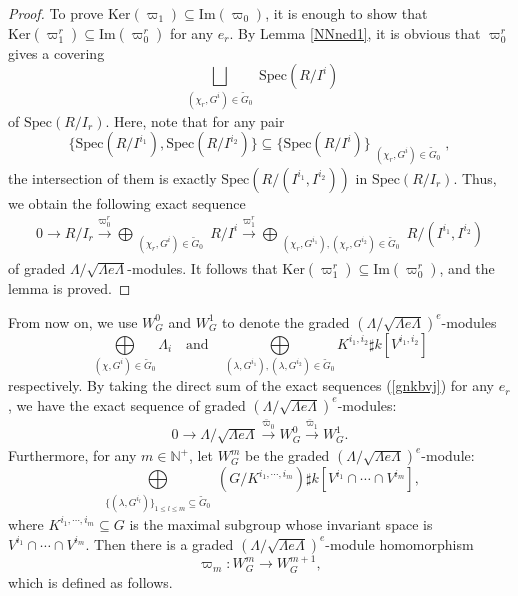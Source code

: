 \documentclass[11pt,reqno]{amsart}
\theoremstyle{definition}
\begin{document}
\begin{proof}
To prove 
$\mathrm{Ker}(\varpi_1)\subseteq
\mathrm{Im}(\varpi_0)$,
it is enough to show that 
$\mathrm{Ker}(\varpi^r_1) \subseteq \mathrm{Im}(\varpi^r_0)$ 
for any $e_r$.
By Lemma \ref{NNned1}, it is obvious that
$\varpi_0^r$ gives a covering
$$\bigsqcup\limits_{\substack{(\chi_r, G^i) \in \tilde{G}_0 
}} \mathrm{Spec}(R/I^i)$$ of $\mathrm{Spec}(R/I_r)$. 
Here, note that for any pair
$$\{ \mathrm{Spec}(R/I^{i_1}), 
\mathrm{Spec}(R/I^{i_2})\} \subseteq \Big\{ \mathrm{Spec}(R/I^i)  
\Big\}_{\substack{(\chi_r, G^i) \in \tilde{G}_0 
}},$$
the intersection of them is exactly 
$\mathrm{Spec}(R/(I^{i_1}, I^{i_2}))$ in $\mathrm{Spec}(R/I_r)$. 
Thus, we obtain the following exact sequence
\begin{align}\label{gnkbvj}
0 \longrightarrow  R/I_r \xrightarrow{\varpi^r_0}  \bigoplus_{\substack{(\chi_r, G^i) 
\in \tilde{G}_0 
}} R/ I^{i} \xrightarrow{\varpi^r_1} 
\bigoplus\limits_{\substack{(\chi_r, G^{i_1}), (\chi_r, G^{i_2}) \in \tilde{G}_0  
}} R/(I^{i_1}, I^{i_2})
\end{align}
of graded 
$\Lambda / \sqrt{\Lambda e \Lambda}$-modules. 
It follows that $\mathrm{Ker}(\varpi^r_1) 
\subseteq \mathrm{Im}(\varpi^r_0)$,
and the lemma is proved.
\end{proof}


From now on, we use $W_G^0$ and $W_G^1$ to denote 
the graded $(\Lambda /\sqrt{\Lambda e \Lambda})^e$-modules 
\begin{equation}
\label{defofWG0}
\bigoplus\limits_{(\chi, G^i) \in \tilde{G}_0} \Lambda_i\quad\mbox{and}\quad
\bigoplus\limits_{(\lambda, G^{i_1}), (\lambda, G^{i_2}) \in \tilde{G}_0}  
K^{i_1, i_2} \sharp k[V^{i_1, i_2}]
\end{equation}
respectively. 
By taking the direct sum of
the
exact sequences (\ref{gnkbvj}) for any $e_r$, we have the 
exact sequence
of graded $(\Lambda /\sqrt{\Lambda e \Lambda})^e$-modules: 
\begin{align}\label{ibyvkl}
0 \longrightarrow \Lambda/ \sqrt{ \Lambda e 
\Lambda }\xrightarrow{\bar{\varpi}_{0}} 
W_G^0 \xrightarrow{\bar{\varpi}_{1}} W_G^1.
\end{align}
Furthermore, for any $m \in \mathbb{N^+}$, 
let $W_G^m$
be the
graded $(\Lambda /\sqrt{\Lambda e \Lambda})^e$-module:
\begin{equation}\label{WGM}
 \bigoplus\limits_{\substack{\{(\lambda, G^{i_l})\}_{1 \leq l \leq m} 
 \subseteq \tilde{G}_0}} (G / K^{i_1, \cdots, i_m} )\sharp k[V^{i_1} \cap \cdots \cap V^{i_m}],
\end{equation}
where $K^{i_1, \cdots, i_m} \subseteq G$ 
is the maximal
subgroup whose invariant space is
$V^{i_1} \cap \cdots \cap V^{i_m}$.
Then there is 
a graded $(\Lambda /\sqrt{\Lambda e \Lambda})^e$-module homomorphism 
$$
\varpi_{m}: W_G^m  \rightarrow W_G^{m+1},
$$
which is defined as follows. 
\end{document}
